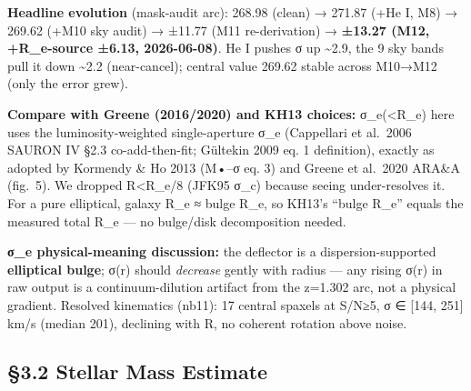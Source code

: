 \documentclass[
]{article}
\begin{document}
\textbf{Headline evolution} (mask-audit arc): 268.98 (clean) → 271.87
(+He I, M8) → 269.62 (+M10 sky audit) → ±11.77 (M11 re-derivation) →
\textbf{±13.27 (M12, +R\_e-source ±6.13, 2026-06-08)}. He I pushes σ up
\textasciitilde2.9, the 9 sky bands pull it down \textasciitilde2.2
(near-cancel); central value 269.62 stable across M10→M12 (only the
error grew).

\textbf{Compare with Greene (2016/2020) and KH13 choices:}
σ\_e(\textless R\_e) here uses the luminosity-weighted single-aperture
σ\_e (Cappellari et al.~2006 SAURON IV §2.3 co-add-then-fit; Gültekin
2009 eq. 1 definition), exactly as adopted by Kormendy \& Ho 2013 (M•--σ
eq. 3) and Greene et al.~2020 ARA\&A (fig.~5). We dropped
R\textless R\_e/8 (JFK95 σ\_c) because seeing under-resolves it. For a
pure elliptical, galaxy R\_e ≈ bulge R\_e, so KH13's ``bulge R\_e''
equals the measured total R\_e --- no bulge/disk decomposition needed.

\textbf{σ\_e physical-meaning discussion:} the deflector is a
dispersion-supported \textbf{elliptical bulge}; σ(r) should
\emph{decrease} gently with radius --- any rising σ(r) in raw output is
a continuum-dilution artifact from the z=1.302 arc, not a physical
gradient. Resolved kinematics (nb11): 17 central spaxels at S/N≥5, σ ∈
{[}144, 251{]} km/s (median 201), declining with R, no coherent rotation
above noise.

\hypertarget{stellar-mass-estimate}{%
\subsection{§3.2 Stellar Mass Estimate}\label{stellar-mass-estimate}}
\end{document}
